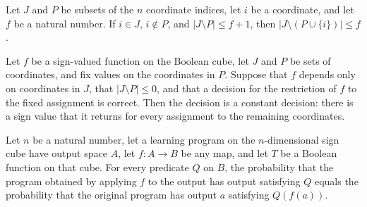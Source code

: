 \begin{theorem}
\label{FABL.card_sdiff_insert_le_of_mem_of_notMem}
\leanok
{}
Let $J$ and $P$ be subsets of the $n$ coordinate indices, let $i$ be a coordinate, and
let $f$ be a natural number. If $i\in J$, $i\notin P$, and $|J\setminus P|\le f+1$, then
$|J\setminus(P\cup\{i\})|\le f$.
\end{theorem}

\begin{theorem}
\label{FABL.exists_constant_of_correctNode_of_card_sdiff_le_zero}
\leanok
{}
Let $f$ be a sign-valued function on the Boolean cube, let $J$ and $P$ be sets of
coordinates, and fix values on the coordinates in $P$. Suppose that $f$ depends only on
coordinates in $J$, that $|J\setminus P|\le 0$, and that a decision for the restriction
of $f$ to the fixed assignment is correct. Then the decision is a constant decision:
there is a sign value that it returns for every assignment to the remaining coordinates.
\end{theorem}

\begin{theorem}
\label{FABL.eventProbability_map_output_eq}
\leanok
{}
Let $n$ be a natural number, let a learning program on the $n$-dimensional sign cube
have output space $A$, let $f:A\to B$ be any map, and let $T$ be a Boolean function on
that cube. For every predicate $Q$ on $B$, the probability that the program obtained by
applying $f$ to the output has output satisfying $Q$ equals the probability that the
original program has output $a$ satisfying $Q(f(a))$.
\end{theorem}

